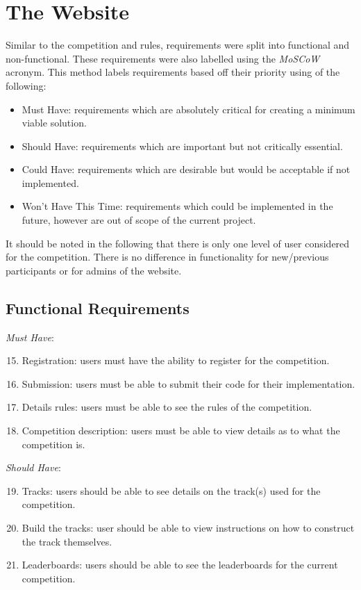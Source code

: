\documentclass{l4proj}
\begin{document}
\section{The Website}
Similar to the competition and rules, requirements were split into functional and non-functional. These requirements were also labelled using the \textit{MoSCoW} acronym. This method labels requirements based off their priority using of the following:
\begin{itemize}
    \item Must Have: requirements which are absolutely critical for creating a minimum viable solution.
    \item Should Have: requirements which are important but not critically essential. 
    \item Could Have: requirements which are desirable but would be acceptable if not implemented.
    \item Won't Have This Time: requirements which could be implemented in the future, however are out of scope of the current project.
\end{itemize}
It should be noted in the following that there is only one level of user considered for the competition. There is no difference in functionality for new/previous participants or for admins of the website.

\subsection{Functional Requirements}
\textit{Must Have}:
\begin{enumerate}[label=\arabic{chapter}.\arabic*]
\setcounter{enumi}{14}
    \item Registration: users must have the ability to register for the competition.
    \item Submission: users must be able to submit their code for their implementation.
    \item Details rules: users must be able to see the rules of the competition.
    \item Competition description: users must be able to view details as to what the competition is.
\end{enumerate}

\textit{Should Have}:
\begin{enumerate}[label=\arabic{chapter}.\arabic*]
\setcounter{enumi}{18}
    \item Tracks: users should be able to see details on the track(s) used for the competition.
    \item Build the tracks: user should be able to view instructions on how to construct the track themselves.
    \item Leaderboards: users should be able to see the leaderboards for the current competition.
\end{enumerate}
\end{document}
